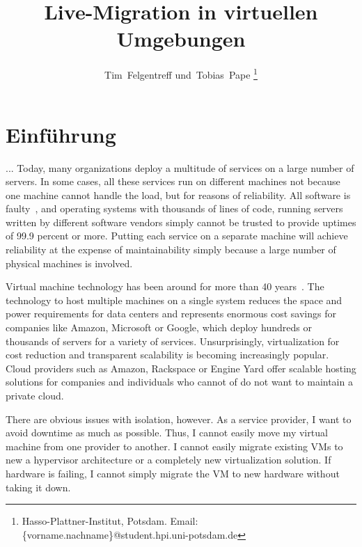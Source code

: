 \documentclass[journal,draft]{IEEEtran}
\title{Live-Migration in virtuellen Umgebungen}
\author{\IEEEauthorblockN{Tim Felgentreff und Tobias Pape}
  \IEEEauthorblockA{Hasso-Plattner-Institut\\
    Potsdam, Germany\\
    Email: \{vorname.nachname\}@student.hpi.uni-potsdam.de}%
}
\author{Tim~Felgentreff und~Tobias~Pape%
\thanks{%
  Hasso-Plattner-Institut, Potsdam.\goodbreak
  Email: \{vorname.nachname\}@student.hpi.uni-potsdam.de}%
}
\begin{document}
\maketitle

\begin{abstract}
  
\end{abstract}

\IEEEpeerreviewmaketitle


\section{Einführung}
\label{sec:einfuehrung}
 ...
Today, many organizations deploy a multitude of services on a large
number of servers. In some cases, all these services run on different
machines not because one machine cannot handle the load, but for
reasons of reliability.  All software is faulty~\cite{zellerprograms},
and operating systems with thousands of lines of code, running servers
written by different software vendors simply cannot be trusted to
provide uptimes of 99.9 percent or more. Putting each service on a
separate machine will achieve reliability at the expense of
maintainability simply because a large number of physical machines is
involved.

Virtual machine technology has been around for more than 40
years~\cite{tanenbaum1992modern}. The technology to host multiple
machines on a single system reduces the space and power requirements
for data centers and represents enormous cost savings for companies
like Amazon, Microsoft or Google, which deploy hundreds or thousands
of servers for a variety of services. Unsurprisingly, virtualization
for cost reduction and transparent scalability is becoming
increasingly popular. Cloud providers such as Amazon, Rackspace or
Engine Yard offer scalable hosting solutions for companies and
individuals who cannot of do not want to maintain a private cloud.

There are obvious issues with isolation, however. As a service
provider, I want to avoid downtime as much as possible. Thus, I cannot
easily move my virtual machine from one provider to another. I cannot
easily migrate existing VMs to new a hypervisor architecture or a
completely new virtualization solution. If hardware is failing, I
cannot simply migrate the VM to new hardware without taking it down.
\end{document}

